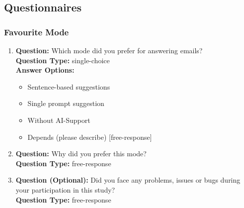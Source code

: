 \subsection{Questionnaires}\label{sec:appendix_questionnaires}

\subsubsection{Favourite Mode}
\begin{enumerate}
  \item 
    \textbf{Question:} Which mode did you prefer for answering emails? \\
    \textbf{Question Type:} single-choice \\
    \textbf{Answer Options:} 
    \begin{itemize}
      \item Sentence-based suggestions
      \item Single prompt suggestion
      \item Without AI-Support
      \item Depends (please describe) [free-response]
    \end{itemize}
  \item 
    \textbf{Question:} Why did you prefer this mode? \\
    \textbf{Question Type:} free-response

  \item 
    \textbf{Question (Optional):} Did you face any problems, issues or bugs during your participation in this study? \\
    \textbf{Question Type:} free-response
\end{enumerate}


